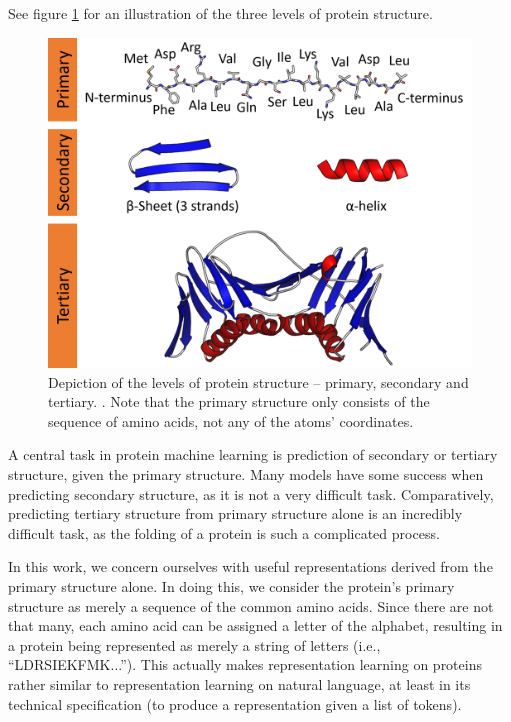 See figure \ref{fig:protein_structure} for an illustration of the three levels of protein structure.

\begin{figure}[ht]
    \centering
    \includegraphics[width = \linewidth]{report/figures/protein_structure.png}
    \caption{Depiction of the levels of protein structure -- primary, secondary and tertiary. \cite{protein_structure_fig}. Note that the primary structure only consists of the sequence of amino acids, not any of the atoms' coordinates.}
    \label{fig:protein_structure}
\end{figure}

A central task in protein machine learning is prediction of secondary or tertiary structure, given the primary structure. Many models have some success when predicting secondary structure, as it is not a very difficult task. Comparatively, predicting tertiary structure from primary structure alone is an incredibly difficult task, as the folding of a protein is such a complicated process.


In this work, we concern ourselves with useful representations derived from the primary structure alone. In doing this, we consider the protein's primary structure as merely a sequence of the common amino acids. Since there are not that many, each amino acid can be assigned a letter of the alphabet, resulting in a protein being represented as merely a string of letters (i.e., ``LDRSIEKFMK...''). This actually makes representation learning on proteins rather similar to representation learning on natural language, at least in its technical specification (to produce a representation given a list of tokens).

